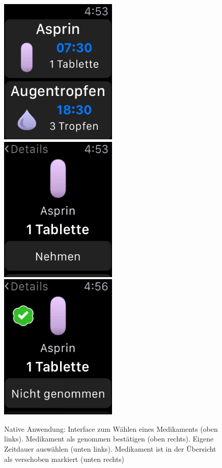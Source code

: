 \begin{figure}
	\caption{Native Anwendung: Interface zum Wählen eines Medikaments (oben links). Medikament als genommen bestätigen (oben rechts). Eigene Zeitdauer auswählen (unten links). Medikament ist in der Übersicht als verschoben markiert (unten rechts)}
	\label{fig:watch-app-take}
	\includegraphics[width=0.5\textwidth]{04_realisation/screenshots/watch/notTaken01.png}
	\includegraphics[width=0.5\textwidth]{04_realisation/screenshots/watch/notTaken02.png}
	\includegraphics[width=0.5\textwidth]{04_realisation/screenshots/watch/taken01.png}

\end{figure}
